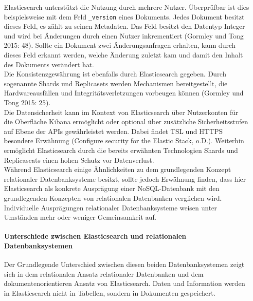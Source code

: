 \documentclass[a4paper]{scrartcl}
\begin{document}
Elasticsearch unterstützt die Nutzung durch mehrere Nutzer. Überprüfbar ist dies beispielsweise mit dem Feld \texttt{\_version} eines Dokuments. Jedes Dokument besitzt dieses Feld, es zählt zu seinen Metadaten. Das Feld besitzt den Datentyp Integer und wird bei Änderungen durch einen Nutzer inkrementiert (Gormley und Tong 2015: 48). Sollte ein Dokument zwei Änderungsanfragen erhalten, kann durch dieses Feld erkannt werden, welche Änderung zuletzt kam und damit den Inhalt des Dokuments verändert hat. \\

Die Konsistenzgewährung ist ebenfalls durch Elasticsearch gegeben. Durch sogenannte Shards und Replicasets werden Mechanismen bereitgestellt, die Hardwareausfällen und Integritätsverletzungen vorbeugen können (Gormley und Tong 2015: 25). \\

Die Datensicherheit kann im Kontext von Elasticsearch über Nutzerkonten für die Oberfläche Kibana ermöglicht oder optional über zusätzliche Sicherheitsstufen auf Ebene der APIs gewährleistet werden. Dabei findet TSL und HTTPS besondere Erwähnung (Configure security for the Elastic Stack, o.D.). Weiterhin ermöglicht Elasticsearch durch die bereits erwähnten Technologien Shards und Replicaseats einen hohen Schutz vor Datenverlust. \\ 

Während Elasticsearch einige Ähnlichkeiten zu dem grundlegenden Konzept relationaler Datenbanksysteme besitzt, sollte jedoch Erwähnung finden, dass hier Elasticsearch als konkrete Ausprägung einer NoSQL-Datenbank mit den grundlegenden Konzepten von relationalen Datenbanken verglichen wird. Individuelle Ausprägungen relationaler Datenbanksysteme weisen unter Umständen mehr oder weniger Gemeinsamkeit auf.

\paragraph{Unterschiede zwischen Elasticsearch und relationalen Datenbanksystemen}
Der Grundlegende Unterschied zwischen diesen beiden Datenbanksystemen zeigt sich in dem relationalen Ansatz relationaler Datenbanken und dem dokumentenorientieren Ansatz von Elasticsearch. Daten und Information werden in Elasticsearch nicht in Tabellen, sondern in Dokumenten gespeichert. \\
\end{document}
